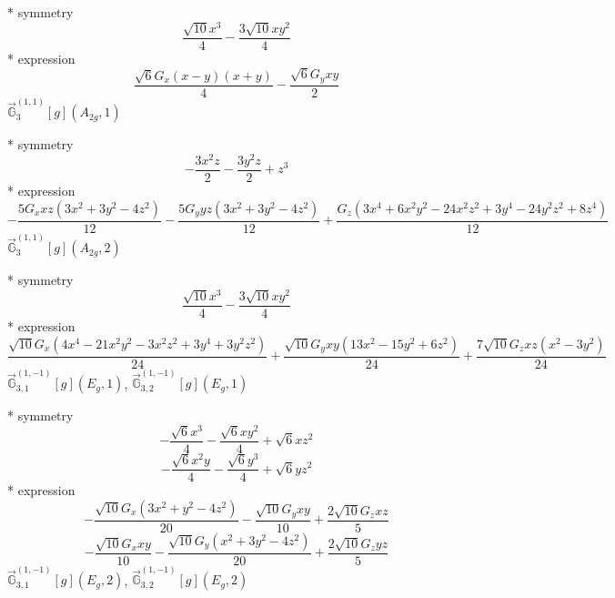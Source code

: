 \documentclass[fleqn,8pt]{jsarticle}
\begin{document}
\noindent\quad ** symmetry
\begin{dmath*}
\frac{\sqrt{10} x^{3}}{4} - \frac{3 \sqrt{10} x y^{2}}{4}
\end{dmath*}
\noindent\quad ** expression
\begin{dmath*}
\frac{\sqrt{6} G_{x} \left(x - y\right) \left(x + y\right)}{4} - \frac{\sqrt{6} G_{y} x y}{2}
\end{dmath*}
\noindent\quad $\vec{\mathbb{G}}_{3}^{(1,1)}[g](A_{2g},1)$

\noindent\quad ** symmetry
\begin{dmath*}
- \frac{3 x^{2} z}{2} - \frac{3 y^{2} z}{2} + z^{3}
\end{dmath*}
\noindent\quad ** expression
\begin{dmath*}
- \frac{5 G_{x} x z \left(3 x^{2} + 3 y^{2} - 4 z^{2}\right)}{12} - \frac{5 G_{y} y z \left(3 x^{2} + 3 y^{2} - 4 z^{2}\right)}{12} + \frac{G_{z} \left(3 x^{4} + 6 x^{2} y^{2} - 24 x^{2} z^{2} + 3 y^{4} - 24 y^{2} z^{2} + 8 z^{4}\right)}{12}
\end{dmath*}
\noindent\quad $\vec{\mathbb{G}}_{3}^{(1,1)}[g](A_{2g},2)$

\noindent\quad ** symmetry
\begin{dmath*}
\frac{\sqrt{10} x^{3}}{4} - \frac{3 \sqrt{10} x y^{2}}{4}
\end{dmath*}
\noindent\quad ** expression
\begin{dmath*}
\frac{\sqrt{10} G_{x} \left(4 x^{4} - 21 x^{2} y^{2} - 3 x^{2} z^{2} + 3 y^{4} + 3 y^{2} z^{2}\right)}{24} + \frac{\sqrt{10} G_{y} x y \left(13 x^{2} - 15 y^{2} + 6 z^{2}\right)}{24} + \frac{7 \sqrt{10} G_{z} x z \left(x^{2} - 3 y^{2}\right)}{24}
\end{dmath*}
\noindent\quad $\vec{\mathbb{G}}_{3,1}^{(1,-1)}[g](E_{g},1)$, $\vec{\mathbb{G}}_{3,2}^{(1,-1)}[g](E_{g},1)$

\noindent\quad ** symmetry
\begin{dmath*}
- \frac{\sqrt{6} x^{3}}{4} - \frac{\sqrt{6} x y^{2}}{4} + \sqrt{6} x z^{2}
\end{dmath*}
\begin{dmath*}
- \frac{\sqrt{6} x^{2} y}{4} - \frac{\sqrt{6} y^{3}}{4} + \sqrt{6} y z^{2}
\end{dmath*}
\noindent\quad ** expression
\begin{dmath*}
- \frac{\sqrt{10} G_{x} \left(3 x^{2} + y^{2} - 4 z^{2}\right)}{20} - \frac{\sqrt{10} G_{y} x y}{10} + \frac{2 \sqrt{10} G_{z} x z}{5}
\end{dmath*}
\begin{dmath*}
- \frac{\sqrt{10} G_{x} x y}{10} - \frac{\sqrt{10} G_{y} \left(x^{2} + 3 y^{2} - 4 z^{2}\right)}{20} + \frac{2 \sqrt{10} G_{z} y z}{5}
\end{dmath*}
\noindent\quad $\vec{\mathbb{G}}_{3,1}^{(1,-1)}[g](E_{g},2)$, $\vec{\mathbb{G}}_{3,2}^{(1,-1)}[g](E_{g},2)$
\end{document}
